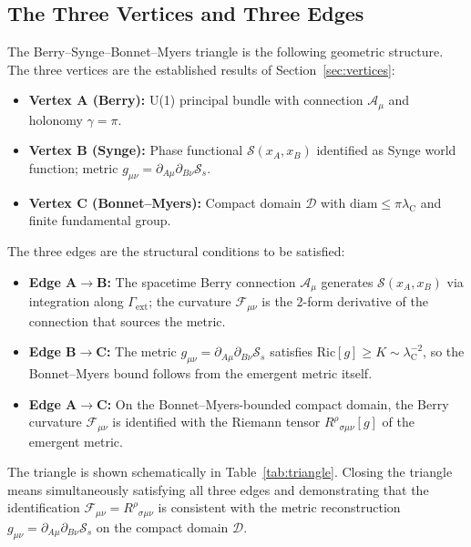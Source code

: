 \documentclass[%
 reprint, amsmath,amssymb, aps, prd, ]{revtex4-2}
\numberwithin{equation}{section}
\newcommand{\lambdaC}{\lambda_{\mathrm{C}}}
\newcommand{\BerryA}{\mathcal{A}}
\newcommand{\BerryF}{\mathcal{F}}
\newcommand{\SyngeS}{\mathcal{S}}
\begin{document}
\subsection{The Three Vertices and Three Edges}

The Berry--Synge--Bonnet--Myers triangle is the following geometric structure.
The three vertices are the established results of Section~\ref{sec:vertices}:
\begin{itemize}[leftmargin=1.5em]
\item \textbf{Vertex A (Berry):} U(1) principal bundle with connection $\BerryA_\mu$ and holonomy $\gamma = \pi$.
\item \textbf{Vertex B (Synge):} Phase functional $\SyngeS(x_A,x_B)$ identified as Synge world function; metric $g_{\mu\nu} = \partial_{A\mu}\partial_{B\nu}\SyngeS_s$.
\item \textbf{Vertex C (Bonnet--Myers):} Compact domain $\mathcal{D}$ with $\mathrm{diam} \leq \pi\lambdaC$ and finite fundamental group.
\end{itemize}
The three edges are the structural conditions to be satisfied:
\begin{itemize}[leftmargin=1.5em]
\item \textbf{Edge A$\to$B:} The spacetime Berry connection $\BerryA_\mu$ generates $\SyngeS(x_A,x_B)$ via integration along $\Gamma_\mathrm{ext}$; the curvature $\BerryF_{\mu\nu}$ is the 2-form derivative of the connection that sources the metric.
\item \textbf{Edge B$\to$C:} The metric $g_{\mu\nu} = \partial_{A\mu}\partial_{B\nu}\SyngeS_s$ satisfies $\mathrm{Ric}[g] \geq K \sim \lambdaC^{-2}$, so the Bonnet--Myers bound follows from the emergent metric itself.
\item \textbf{Edge A$\to$C:} On the Bonnet--Myers-bounded compact domain, the Berry curvature $\BerryF_{\mu\nu}$ is identified with the Riemann tensor $R^\rho{}_{\sigma\mu\nu}[g]$ of the emergent metric.
\end{itemize}
The triangle is shown schematically in Table~\ref{tab:triangle}.
Closing the triangle means simultaneously satisfying all three edges and demonstrating that the identification $\BerryF_{\mu\nu} = R^\rho{}_{\sigma\mu\nu}$ is consistent with the metric reconstruction $g_{\mu\nu} = \partial_{A\mu}\partial_{B\nu}\SyngeS_s$ on the compact domain $\mathcal{D}$.
\end{document}

